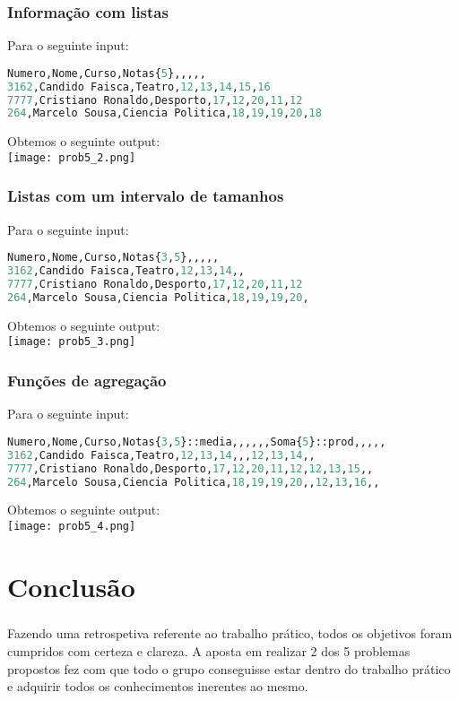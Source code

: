 \documentclass[11pt,a4paper]{report}
\begin{document}
\subsection{Informação com listas} 
    Para o seguinte input:
\begin{lstlisting}[language=Python]
Numero,Nome,Curso,Notas{5},,,,,
3162,Candido Faisca,Teatro,12,13,14,15,16
7777,Cristiano Ronaldo,Desporto,17,12,20,11,12
264,Marcelo Sousa,Ciencia Politica,18,19,19,20,18
\end{lstlisting}
Obtemos o seguinte output: \\
\texttt{[image: prob5\_2.png]} \\

\subsection{Listas com um intervalo de tamanhos} 
    Para o seguinte input:
\begin{lstlisting}[language=Python]
Numero,Nome,Curso,Notas{3,5},,,,,
3162,Candido Faisca,Teatro,12,13,14,,
7777,Cristiano Ronaldo,Desporto,17,12,20,11,12
264,Marcelo Sousa,Ciencia Politica,18,19,19,20,
\end{lstlisting}
Obtemos o seguinte output: \\
\texttt{[image: prob5\_3.png]} \\

\subsection{Funções de agregação} 
    Para o seguinte input:
\begin{lstlisting}[language=Python]
Numero,Nome,Curso,Notas{3,5}::media,,,,,,Soma{5}::prod,,,,,
3162,Candido Faisca,Teatro,12,13,14,,,12,13,14,,
7777,Cristiano Ronaldo,Desporto,17,12,20,11,12,12,13,15,,
264,Marcelo Sousa,Ciencia Politica,18,19,19,20,,12,13,16,,
\end{lstlisting}
Obtemos o seguinte output: \\
\texttt{[image: prob5\_4.png]} \\

\chapter{Conclusão}
\paragraph{}
Fazendo uma retrospetiva referente ao trabalho prático, todos os objetivos foram cumpridos com certeza e clareza. A aposta em realizar 2 dos 5 problemas propostos fez com que todo o grupo conseguisse estar dentro do trabalho prático e adquirir todos os conhecimentos inerentes ao mesmo.
\end{document}
